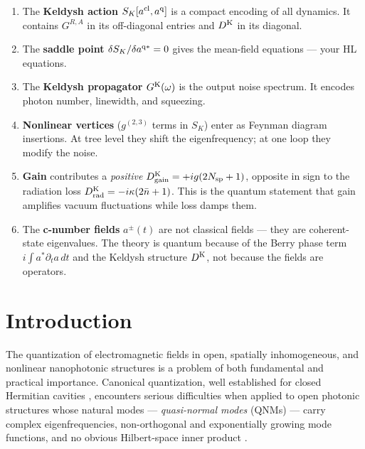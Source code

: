 \documentclass[12pt]{article}
\newcommand{\cl}{{\rm cl}}
\newcommand{\q}{{\rm q}}
\newcommand{\Keldysh}{{\rm K}}
\begin{document}
\begin{enumerate}
  \item The \textbf{Keldysh action} $S_K[a^\cl, a^\q]$ is a compact
    encoding of all dynamics.  It contains $G^{R,A}$ in its off-diagonal
    entries and $D^\Keldysh$ in its diagonal.

  \item The \textbf{saddle point} $\delta S_K/\delta a^{\q*}=0$ gives
    the mean-field equations --- your HL equations.

  \item The \textbf{Keldysh propagator} $G^\Keldysh(\omega)$ is the
    output noise spectrum.  It encodes photon number, linewidth, and
    squeezing.

  \item \textbf{Nonlinear vertices} ($g^{(2,3)}$ terms in $S_K$) enter
    as Feynman diagram insertions.  At tree level they shift the
    eigenfrequency; at one loop they modify the noise.

  \item \textbf{Gain} contributes a \emph{positive} $D^\Keldysh_{\rm gain}
    = +ig(2N_{\rm sp}+1)$, opposite in sign to the radiation loss
    $D^\Keldysh_{\rm rad} = -i\kappa(2\bar{n}+1)$.  This is the quantum
    statement that gain amplifies vacuum fluctuations while loss damps them.

  \item The \textbf{c-number fields} $a^\pm(t)$ are not classical fields
    --- they are coherent-state eigenvalues.  The theory is quantum because
    of the Berry phase term $i\int a^*\partial_t a\,dt$ and the Keldysh structure
    $D^\Keldysh$, not because the fields are operators.
\end{enumerate}


\section{Introduction}
\label{sec:intro}

The quantization of electromagnetic fields in open, spatially inhomogeneous,
and nonlinear nanophotonic structures is a problem of both fundamental and
practical importance.  Canonical quantization, well established for closed
Hermitian cavities \cite{Mandel1995,Walls2008}, encounters serious
difficulties when applied to open photonic structures whose natural modes
--- \emph{quasi-normal modes} (QNMs) --- carry complex eigenfrequencies,
non-orthogonal and exponentially growing mode functions, and no obvious
Hilbert-space inner product \cite{Lalanne2018,Kristensen2015}.
\end{document}
